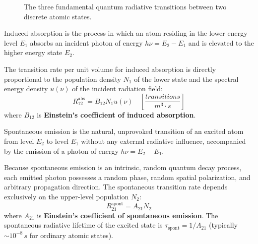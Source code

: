 \begin{figure}[htbp]
\caption{The three fundamental quantum radiative transitions between two discrete atomic states.}
\label{fig:three-transitions}
\end{figure}

\begin{definition}
Induced absorption is the process in which an atom residing in the lower energy level $E_1$ absorbs an incident photon of energy $h\nu = E_2 - E_1$ and is elevated to the higher energy state $E_2$.
\end{definition}
The transition rate per unit volume for induced absorption is directly proportional to the population density $N_1$ of the lower state and the spectral energy density $u(\nu)$ of the incident radiation field:
\begin{equation}
    R_{12}^{\text{abs}} = B_{12} N_1 u(\nu) \quad \left[\si{\frac{transitions}{m^3\cdot s}}\right]
\end{equation}
where $B_{12}$ is \textbf{Einstein's coefficient of induced absorption}.

\begin{definition}
Spontaneous emission is the natural, unprovoked transition of an excited atom from level $E_2$ to level $E_1$ without any external radiative influence, accompanied by the emission of a photon of energy $h\nu = E_2 - E_1$.
\end{definition}
Because spontaneous emission is an intrinsic, random quantum decay process, each emitted photon possesses a random phase, random spatial polarization, and arbitrary propagation direction. The spontaneous transition rate depends exclusively on the upper-level population $N_2$:
\begin{equation}
    R_{21}^{\text{spont}} = A_{21} N_2
\end{equation}
where $A_{21}$ is \textbf{Einstein's coefficient of spontaneous emission}. The spontaneous radiative lifetime of the excited state is $\tau_{\text{spont}} = 1/A_{21}$ (typically $\sim 10^{-8}\,\si{s}$ for ordinary atomic states).

